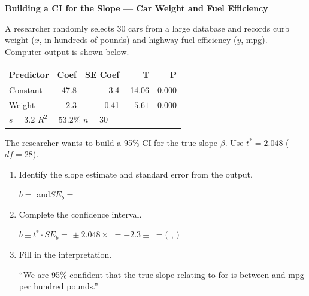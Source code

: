 \documentclass[10pt]{article}
\begin{document}
\namepartnerperiod

\vspace{0.1in}
\textbf{Building a CI for the Slope --- Car Weight and Fuel Efficiency}

\vspace{0.05in}
A researcher randomly selects 30 cars from a large database and records curb weight
($x$, in hundreds of pounds) and highway fuel efficiency ($y$, mpg).
Computer output is shown below.

\vspace{0.1in}
\begin{center}
\renewcommand{\arraystretch}{1.3}
\begin{tabular}{lrrrr}
    \textbf{Predictor} & \textbf{Coef} & \textbf{SE Coef} & \textbf{T} & \textbf{P} \\
    \hline
    Constant & 47.8 & 3.4 & 14.06 & 0.000 \\
    Weight   & $-2.3$ & 0.41 & $-5.61$ & 0.000 \\
    \hline
    \multicolumn{5}{l}{$s = 3.2$ \quad $R^2 = 53.2\%$ \quad $n = 30$}
\end{tabular}
\end{center}

\vspace{0.05in}
The researcher wants to build a 95\% CI for the true slope $\beta$.
Use $t^* = 2.048$ ($df = 28$).

\vspace{0.1in}

\begin{tcolorbox}[colback=white, colframe=black!40,
    title=\textbf{Tier R --- Remediate},
    fonttitle=\bfseries, arc=2mm, left=3mm, right=3mm, top=2mm, bottom=2mm]

\begin{enumerate}[label=\alph*.]

    \item Identify the slope estimate and standard error from the output.

          $b = $ \quad and\quad $SE_b = $ 

    \item Complete the confidence interval.

          $b \pm t^* \cdot SE_b
          = $  $\pm\ 2.048 \times $ 
          $= -2.3 \pm$ 
          $= ($ ,\; $)$

    \item Fill in the interpretation.

          ``We are 95\% confident that the true slope relating
           to 
          for 
          is between  and 
          mpg per hundred pounds.''

\end{enumerate}
\end{tcolorbox}
\end{document}
